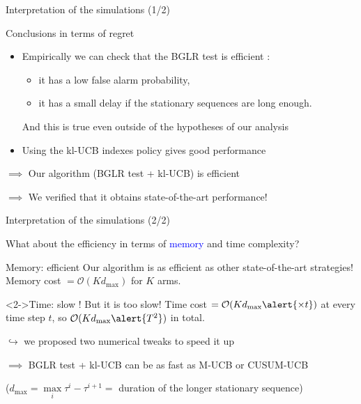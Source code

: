 \documentclass[11pt,english,ignorenonframetext,]{beamer}
\providecommand{\tightlist}{%
  \setlength{\itemsep}{0pt}\setlength{\parskip}{0pt}}
\begin{document}
\begin{frame}{Interpretation of the simulations (1/2)}

  \begin{block}{Conclusions in terms of regret}
    \begin{itemize}
      \item
      Empirically we can check that the \alert{BGLR test is efficient} \dCooley{} :
      \begin{itemize}\tightlist
        \item
        it has a \alert{low false alarm probability},
        \item
        it has a \alert{small delay} if the stationary sequences are long enough.
      \end{itemize}
      And this is true even outside of the hypotheses of our analysis
      \item
      Using the kl-UCB indexes policy gives good performance \dCooley{}
    \end{itemize}
    $\implies$ Our algorithm (BGLR test + kl-UCB) is efficient

    $\implies$ We verified that it obtains state-of-the-art performance!
  \end{block}

\end{frame}


\begin{frame}{Interpretation of the simulations (2/2)}

  What about the efficiency in terms of \textcolor{blue}{memory} and \alert{time} complexity?

  \begin{block}{Memory: efficient \dSmiley}
    Our algorithm is as efficient as other state-of-the-art strategies!\\
    Memory cost $= \mathcal{O}(K d_{\max})$
    for $K$ arms.
  \end{block}

  \begin{alertblock}<2->{Time: slow \dSadey{} !}
    But it is too slow!
    Time cost $= \mathcal{O}(K d_{\max} \alert{\times t})$
    at every time step $t$,
    so $\mathcal{O}(K d_{\max} \alert{T^2})$ in total.

    $\hookrightarrow$ we proposed two numerical tweaks to speed it up

    $\implies$ BGLR test + kl-UCB can be as fast as M-UCB or CUSUM-UCB

  \end{alertblock}

  \begin{small}
    ($d_{\max} = \max\limits_i \tau^i - \tau^{i+1} =$ duration of the longer stationary sequence)
  \end{small}

\end{frame}
\end{document}
